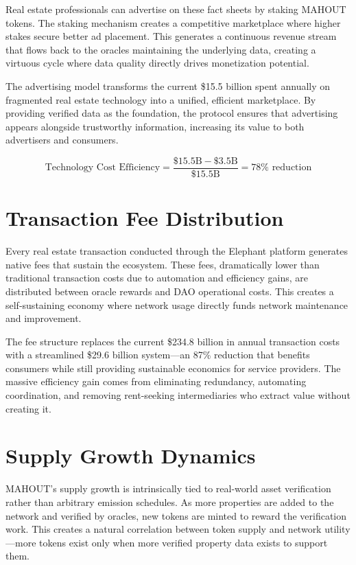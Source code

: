 Real estate professionals can advertise on these fact sheets by staking MAHOUT tokens. The staking mechanism creates a competitive marketplace where higher stakes secure better ad placement. This generates a continuous revenue stream that flows back to the oracles maintaining the underlying data, creating a virtuous cycle where data quality directly drives monetization potential.

The advertising model transforms the current \$15.5 billion spent annually on fragmented real estate technology into a unified, efficient marketplace. By providing verified data as the foundation, the protocol ensures that advertising appears alongside trustworthy information, increasing its value to both advertisers and consumers.

\[
\text{Technology Cost Efficiency} = \frac{\$15.5\text{B} - \$3.5\text{B}}{\$15.5\text{B}} = 78\% \text{ reduction}
\]

\section{Transaction Fee Distribution}

Every real estate transaction conducted through the Elephant platform generates native fees that sustain the ecosystem. These fees, dramatically lower than traditional transaction costs due to automation and efficiency gains, are distributed between oracle rewards and DAO operational costs. This creates a self-sustaining economy where network usage directly funds network maintenance and improvement.

The fee structure replaces the current \$234.8 billion in annual transaction costs with a streamlined \$29.6 billion system—an 87\% reduction that benefits consumers while still providing sustainable economics for service providers. The massive efficiency gain comes from eliminating redundancy, automating coordination, and removing rent-seeking intermediaries who extract value without creating it.

\section{Supply Growth Dynamics}

MAHOUT's supply growth is intrinsically tied to real-world asset verification rather than arbitrary emission schedules. As more properties are added to the network and verified by oracles, new tokens are minted to reward the verification work. This creates a natural correlation between token supply and network utility—more tokens exist only when more verified property data exists to support them.

